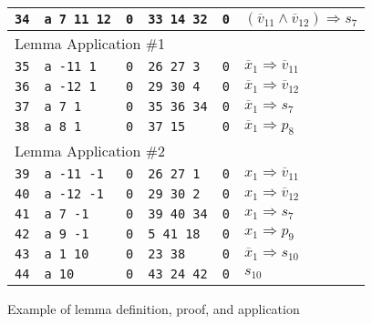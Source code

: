 \documentclass[twoside,11pt]{article}
\newcommand{\obar}[1]{\overline{#1}}
\newcommand{\imply}{\Rightarrow}
\begin{document}
\begin{figure}
\begin{tabular}{llllll}
\texttt{34} & \texttt{a 7 11 12} & \texttt{0} & \texttt{33 14 32} & \texttt{0} & $(\obar{v}_{11} \land \obar{v}_{12}) \imply s_{7}$ \\
\midrule
\multicolumn{6}{l}{Lemma Application \#1} \\
\texttt{35} & \texttt{a -11 1} & \texttt{0} & \texttt{26 27 3} & \texttt{0} & $\obar{x}_1 \imply \obar{v}_{11}$ \\
\texttt{36} & \texttt{a -12 1} & \texttt{0} & \texttt{29 30 4} & \texttt{0} & $\obar{x}_1 \imply \obar{v}_{12}$ \\
\texttt{37} & \texttt{a 7 1} & \texttt{0} & \texttt{35 36 34} & \texttt{0} & $\obar{x}_1 \imply s_7$ \\
\midrule
\texttt{38} & \texttt{a 8 1} & \texttt{0} & \texttt{37 15} & \texttt{0} & $\obar{x}_1 \imply p_8$ \\
\midrule
\multicolumn{6}{l}{Lemma Application \#2} \\
\texttt{39} & \texttt{a -11 -1} & \texttt{0} & \texttt{26 27 1} & \texttt{0} & ${x}_1 \imply \obar{v}_{11}$ \\
\texttt{40} & \texttt{a -12 -1} & \texttt{0} & \texttt{29 30 2} & \texttt{0} & ${x}_1 \imply \obar{v}_{12}$ \\
\texttt{41} & \texttt{a 7 -1} & \texttt{0} & \texttt{39 40 34} & \texttt{0} & ${x}_1 \imply s_7$ \\
\midrule
\texttt{42} & \texttt{a 9 -1} & \texttt{0} & \texttt{5 41 18} & \texttt{0} & ${x}_1 \imply p_9$ \\
\texttt{43} & \texttt{a 1 10} & \texttt{0} & \texttt{23 38} & \texttt{0} & $\obar{x}_1 \imply s_{10}$  \\
\texttt{44} & \texttt{a 10} & \texttt{0} & \texttt{43 24 42} & \texttt{0} & $s_{10}$ \\
\bottomrule
\end{tabular}
\caption{Example of lemma definition, proof, and application}
\label{fig:eg4:lemmas}
\end{figure}
\end{document}
